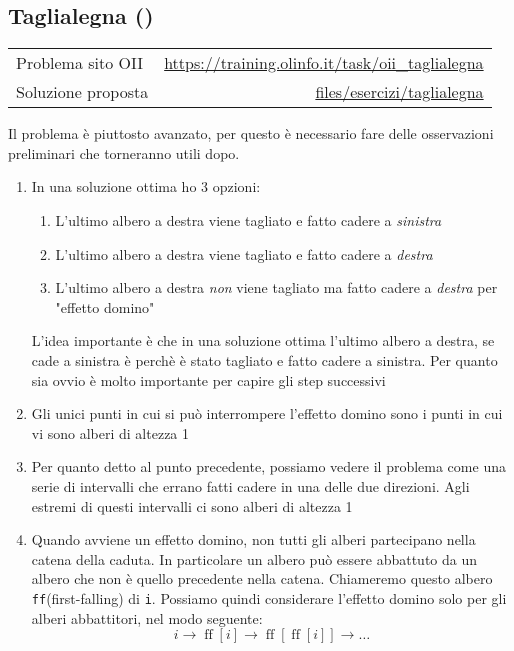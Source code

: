 \subsection{Taglialegna {()}}
\label{sol taglialegna}
\begin{center}
	\begin{tabularx}{\textwidth}{X r}
		\toprule
		Problema sito OII  & \url{https://training.olinfo.it/task/oii_taglialegna}                         \\
		Soluzione proposta & \ttfamily\href{run:./files/esercizi/taglialegna/}{files/esercizi/taglialegna} \\
		\bottomrule
	\end{tabularx}
\end{center}
Il problema è piuttosto avanzato, per questo è necessario fare delle osservazioni preliminari che torneranno utili dopo.
\begin{enumerate}
	\item In una soluzione ottima ho 3 opzioni:
	      \begin{enumerate}
		      \item L'ultimo albero a destra viene tagliato e fatto cadere a \textit{sinistra}
		      \item L'ultimo albero a destra viene tagliato e fatto cadere a \textit{destra}
		      \item L'ultimo albero a destra \textit{non} viene tagliato ma fatto cadere a \textit{destra} per "effetto domino"
	      \end{enumerate}
	      L'idea importante è che in una soluzione ottima l'ultimo albero a destra, se cade a sinistra è perchè è stato tagliato e fatto cadere a sinistra. Per quanto sia ovvio è molto importante per capire gli step successivi
	\item Gli unici punti in cui si può interrompere l'effetto domino sono i punti in cui vi sono alberi di altezza 1
	\item Per quanto detto al punto precedente, possiamo vedere il problema come una serie di intervalli che errano fatti cadere in una delle due direzioni. Agli estremi di questi intervalli ci sono alberi di altezza 1
	\item Quando avviene un effetto domino, non tutti gli alberi partecipano nella catena della caduta. In particolare un albero può essere abbattuto da un albero che non è quello precedente nella catena. Chiameremo questo albero \verb|ff|(first-falling) di \verb|i|. Possiamo quindi considerare l'effetto domino solo per gli alberi abbattitori, nel modo seguente:
	      \[
		      i \rightarrow \operatorname{ff}\left[i\right] \rightarrow \operatorname{ff}\left[\operatorname{ff}\left[i\right]\right] \rightarrow \ldots
	      \]
\end{enumerate}
